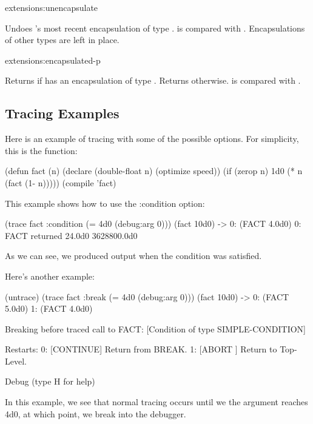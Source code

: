 \begin{defun}{extensions:}{unencapsulate}{}
  
  Undoes 's most recent encapsulation of type .
   is compared with .  Encapsulations of other
  types are left in place.
\end{defun}

\begin{defun}{extensions:}{encapsulated-p}{%
    }
  
  Returns \true{} if  has an encapsulation of type
  .  Returns \nil{} otherwise.   is compared with
  .
\end{defun}

\subsection{Tracing Examples}
  Here is an example of tracing with some of the possible options.
  For simplicity, this is the function:
  \begin{example}
    (defun fact (n)
      (declare (double-float n) (optimize speed))
      (if (zerop n)
          1d0
          (* n (fact (1- n)))))
    (compile 'fact)
  \end{example}

  This example shows how to use the :condition option:
  \begin{example}
    (trace fact :condition (= 4d0 (debug:arg 0)))
    (fact 10d0) ->
      0: (FACT 4.0d0)
      0: FACT returned 24.0d0
    3628800.0d0
  \end{example}
  As we can see, we produced output when the condition was satisfied.

  Here's another example:
  \begin{example}
    (untrace)
    (trace fact :break (= 4d0 (debug:arg 0)))
    (fact 10d0) ->
      0: (FACT 5.0d0)
        1: (FACT 4.0d0)


    Breaking before traced call to FACT:
       [Condition of type SIMPLE-CONDITION]

    Restarts:
      0: [CONTINUE] Return from BREAK.
      1: [ABORT   ] Return to Top-Level.

    Debug  (type H for help)
  \end{example}
  In this example, we see that normal tracing occurs until we the
  argument reaches 4d0, at which point, we break into the debugger.



